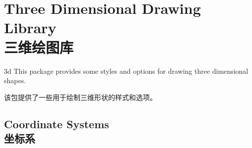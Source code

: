 \setcounter{section}{39}
\setcounter{subsection}{0}
\setcounter{subsubsection}{0}

%
%
%


\section{Three Dimensional Drawing Library\\三维绘图库}

\begin{tikzlibrary}{3d}
    This package provides some styles and options for drawing three dimensional
    shapes.

    该包提供了一些用于绘制三维形状的样式和选项。


\end{tikzlibrary}


\subsection{Coordinate Systems\\坐标系}

